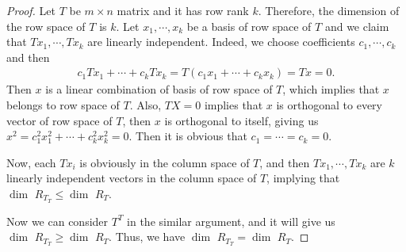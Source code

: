 \documentclass[11pt]{book}
\theoremstyle{definition}
\numberwithin{equation}{chapter}
\begin{document}
\begin{proof}
Let $T$ be $m\times n$ matrix and it has row rank $k$. Therefore, the dimension of the row space of $T$ is $k$. Let $x_1,\cdots,x_k$ be a basis of row space of $T$ and we claim that $Tx_1,\cdots, Tx_k$ are linearly independent. Indeed, we choose coefficients $c_1,\cdots,c_k$ and then 
\begin{align*}
    c_1 Tx_1 + \cdots + c_k Tx_k = T(c_1x_1 +\cdots + c_kx_k) = Tx = 0.
\end{align*}
Then $x$ is a linear combination of basis of row space of $T$, which implies that $x$ belongs to row space of $T$. Also, $TX = 0$ implies that $x$ is orthogonal to every vector of row space of $T$, then $x$ is orthogonal to itself, giving us $x^2 = c_1^2 x_1^2 + \cdots + c_k^2 x_k^2 = 0$. Then it is obvious that $c_1 = \cdots = c_k = 0$.

Now, each $Tx_i$ is obviously in the column space of $T$, and then $Tx_1,\cdots, Tx_k$ are $k$ linearly independent vectors in the column space of $T$, implying that $ \dim \,\, R_{T_T}\leq  \dim \,\,R_T$. 

Now we can consider $T^T$ in the similar argument, and it will give us $ \dim \,\, R_{T_T}\geq  \dim \,\,R_T$. Thus, we have $ \dim \,\, R_{T_T} =  \dim \,\,R_T$. 
\end{proof}

\medskip
\end{document}
